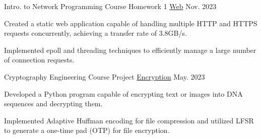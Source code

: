 

\begin{cventries}

  \cventry
    {Intro. to Network Programming Course Homework 1}
     {\href{https://github.com/bee0511/INP/tree/main/homework1}{\faGithubSquare\acvHeaderIconSep\@Static Web}}
    {} 
    {Nov. 2023} 
    {
      \begin{cvitems} %
        \item {Created a static web application capable of handling multiple HTTP and HTTPS requests concurrently, achieving a transfer rate of 3.8GB/s.}
        \item {Implemented epoll and threading techniques to efficiently manage a large number of connection requests.}
      \end{cvitems}
    }


  \cventry
    {Cryptography Engineering Course Project}
    {\href{https://github.com/bee0511/DNA-Encryption}{\faGithubSquare\acvHeaderIconSep\@DNA Encryption}} 
    {} 
    {May. 2023} 
    {
      \begin{cvitems} %
        \item {Developed a Python program capable of encrypting text or images into DNA sequences and decrypting them.}
        \item {Implemented Adaptive Huffman encoding for file compression and utilized LFSR to generate a one-time pad (OTP) for file encryption.}
      \end{cvitems}
    }





\end{cventries}
